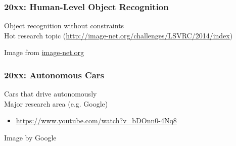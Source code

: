 \documentclass[xetex,professionalfont]{beamer}
\newcommand{\eg}{\mbox{e.g.}\xspace} %
\begin{document}

\begin{frame}
\frametitle{20xx: Human-Level Object Recognition}

Object recognition without constraints\\\medskip %
Hot research topic \scriptsize(\url{http://image-net.org/challenges/LSVRC/2014/index})\normalsize

\bigskip
\begin{center}
	{\centering Image from \url{image-net.org}}
\end{center}

\end{frame}


\begin{frame}
\frametitle{20xx: Autonomous Cars}

Cars that drive autonomously\\\medskip
Major research area (\eg Google) %
\begin{itemize}
	\item \url{https://www.youtube.com/watch?v=bDOnn0-4Nq8}
\end{itemize}

\bigskip
\begin{center}
	{\centering Image by Google}
\end{center}

\end{frame}
\end{document}
